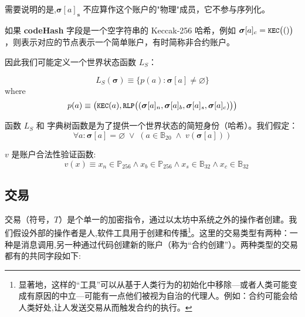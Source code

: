 \documentclass[9pt,oneside]{amsart}
\begin{document}
\begin{multicols}{2}
需要说明的是,$\boldsymbol{\sigma}[a]_\mathbf{s}$ 不应算作这个账户的"物理"成员，它不参与序列化。

如果 \textbf{codeHash} 字段是一个空字符串的 Keccak-256 哈希，例如 $\boldsymbol{\sigma}[a]_c = \texttt{\small KEC}\big(()\big)$，则表示对应的节点表示一个简单账户，有时简称非合约账户。


因此我们可能定义一个世界状态函数 $L_S$：

\begin{equation}
L_S(\boldsymbol{\sigma}) \equiv \{ p(a): \boldsymbol{\sigma}[a] \neq \varnothing \}
\end{equation}
where
\begin{equation}
p(a) \equiv  \big(\texttt{\small KEC}(a), \texttt{\small RLP}\big( (\boldsymbol{\sigma}[a]_n, \boldsymbol{\sigma}[a]_b, \boldsymbol{\sigma}[a]_s, \boldsymbol{\sigma}[a]_c) \big) \big)
\end{equation}

函数 $L_S$ 和 字典树函数是为了提供一个世界状态的简短身份（哈希）。我们假定：
\begin{equation}
\forall a: \boldsymbol{\sigma}[a] = \varnothing \; \vee \; (a \in \mathbb{B}_{20} \; \wedge \; v(\boldsymbol{\sigma}[a]))
\end{equation}

$v$ 是账户合法性验证函数:
\begin{equation}
\quad v(x) \equiv x_n \in \mathbb{P}_{256} \wedge x_b \in \mathbb{P}_{256} \wedge x_s \in \mathbb{B}_{32} \wedge x_c \in \mathbb{B}_{32}
\end{equation}


\subsection{交易} \label{ch:transaction}

交易（符号，$T$）是个单一的加密指令，通过以太坊中系统之外的操作者创建。我们假设外部的操作者是人,软件工具用于创建和传播\footnote{显著地，这样的“工具”可以从基于人类行为的初始化中移除---或者人类可能变成有原因的中立---可能有一点他们被视为自治的代理人。例如：合约可能会给人类好处,让人发送交易从而触发合约的执行。}。这里的交易类型有两种：一种是消息调用,另一种通过代码创建新的账户（称为“合约创建”）。两种类型的交易都有的共同字段如下:


\end{multicols}
\end{document}
